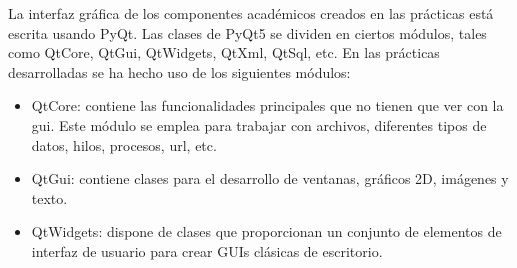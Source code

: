La interfaz gráfica de los componentes académicos creados en las prácticas está escrita usando PyQt. Las clases de PyQt5 se dividen en ciertos módulos, tales como QtCore, QtGui, QtWidgets, QtXml, QtSql, etc. En las prácticas desarrolladas se ha hecho uso de los siguientes módulos:

\begin{itemize}
\item QtCore: contiene las funcionalidades principales que no tienen que ver con la \acrshort{gui}. Este módulo se emplea para trabajar con archivos, diferentes tipos de datos, hilos, procesos, url, etc.
\item QtGui: contiene clases para el desarrollo de ventanas, gráficos 2D, imágenes y texto.
\item QtWidgets: dispone de clases que proporcionan un conjunto de elementos de interfaz de usuario para crear GUIs clásicas de escritorio. 
\end{itemize}